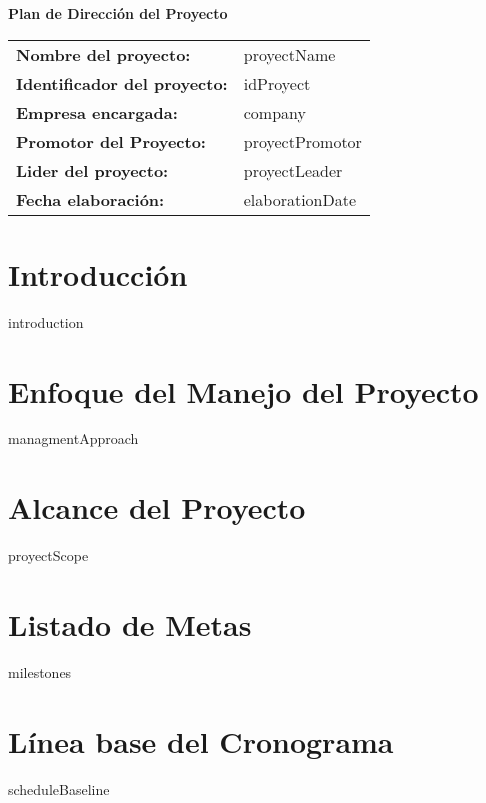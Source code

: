 \documentclass{article}
\begin{document}
\begin{center}
{\huge\textbf{Plan de Dirección del Proyecto}}\\[14cm]
\end{center}

\vspace{0.5cm}

\newcommand{\wrappingmulticolumn}[3]
    {\multicolumn{#1}
                 {|>{\hsize=\dimexpr#1\hsize+\tabcolsep * (2 * (#1 - 1) )+\arrayrulewidth* (#1 - 2)\relax}#2|}
                 {#3}}
\renewcommand{\arraystretch}{1.5} %


\begin{tabular}{|ll|} \hline
\rowcolor{gray!10}\textbf{Nombre del proyecto:} & {{proyectName}} \\[0.3cm]
\textbf{Identificador del proyecto:} & {{idProyect}} \\[0.3cm]
\textbf{Empresa encargada:} & {{company}} \\[0.3cm]
\textbf{Promotor del Proyecto:} & {{proyectPromotor}} \\[0.3cm]
\textbf{Lider del proyecto:} & {{proyectLeader}} \\[0.3cm]
\textbf{Fecha elaboración:} & {{elaborationDate}} \\ \hline
\end{tabular}

\newpage

\tableofcontents
\newpage

\section{Introducción}
{{introduction}}
\section{Enfoque del Manejo del Proyecto}
{{managmentApproach}}
\section{Alcance del Proyecto}
{{proyectScope}}
\section{Listado de Metas}
{{milestones}}
\section{Línea base del Cronograma}
{{scheduleBaseline}}
\end{document}
